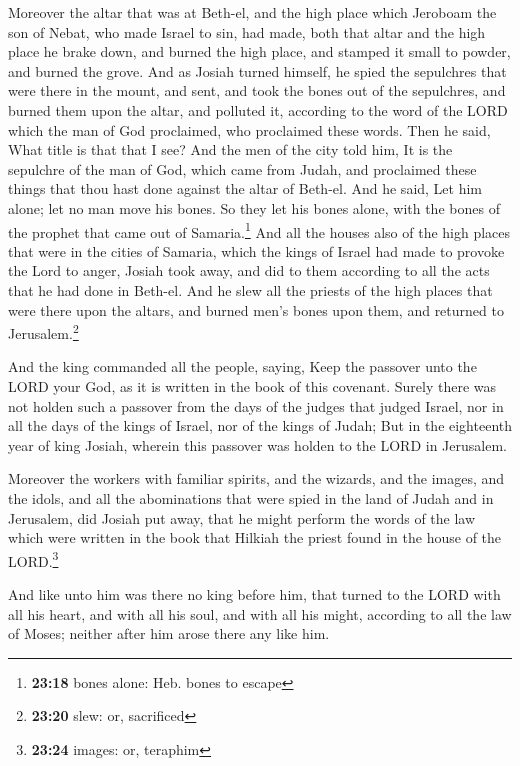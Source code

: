  Moreover the altar that was at Beth-el, and the high
place which Jeroboam the son of Nebat, who made Israel to sin, had made,
both that altar and the high place he brake down, and burned the high
place, and stamped it small to powder, and burned the grove.
 And as Josiah turned himself, he spied the sepulchres
that were there in the mount, and sent, and took the bones out of the
sepulchres, and burned them upon the altar, and polluted it, according
to the word of the LORD which the man of God proclaimed, who proclaimed
these words.  Then he said, What title is that that I
see? And the men of the city told him, It is the sepulchre of the man of
God, which came from Judah, and proclaimed these things that thou hast
done against the altar of Beth-el.  And he said, Let him
alone; let no man move his bones. So they let his bones alone, with the
bones of the prophet that came out of Samaria.\footnote{\textbf{23:18}
  bones alone: Heb. bones to escape}  And all the houses
also of the high places that were in the cities of Samaria, which the
kings of Israel had made to provoke the Lord to anger, Josiah took away,
and did to them according to all the acts that he had done in Beth-el.
 And he slew all the priests of the high places that were
there upon the altars, and burned men's bones upon them, and returned to
Jerusalem.\footnote{\textbf{23:20} slew: or, sacrificed}

 And the king commanded all the people, saying, Keep the
passover unto the LORD your God, as it is written in the book of this
covenant.  Surely there was not holden such a passover
from the days of the judges that judged Israel, nor in all the days of
the kings of Israel, nor of the kings of Judah;  But in
the eighteenth year of king Josiah, wherein this passover was holden to
the LORD in Jerusalem.

 Moreover the workers with familiar spirits, and the
wizards, and the images, and the idols, and all the abominations that
were spied in the land of Judah and in Jerusalem, did Josiah put away,
that he might perform the words of the law which were written in the
book that Hilkiah the priest found in the house of the LORD.\footnote{\textbf{23:24}
  images: or, teraphim}

 And like unto him was there no king before him, that
turned to the LORD with all his heart, and with all his soul, and with
all his might, according to all the law of Moses; neither after him
arose there any like him.

